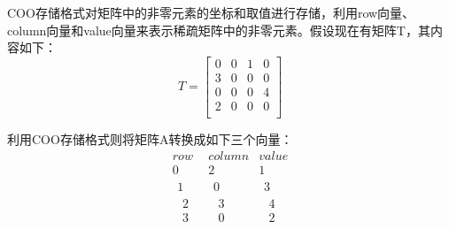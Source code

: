 COO存储格式对矩阵中的非零元素的坐标和取值进行存储，利用row向量、column向量和value向量来表示稀疏矩阵中的非零元素。假设现在有矩阵T，其内容如下：
\[T=\left[ \begin{matrix}
	0&		0&		1&		0\\
	3&		0&		0&		0\\
	0&		0&		0&		4\\
	2&		0&		0&		0\\
\end{matrix} \right] \]

利用COO存储格式则将矩阵A转换成如下三个向量：
\[\begin{matrix}
	row&		column&		value\\
	0&		2&		1\\
	\begin{array}{c}
	1\\
	\begin{array}{c}
	2\\
	3\\
\end{array}\\
\end{array}&		\begin{array}{c}
	0\\
	\begin{array}{c}
	3\\
	0\\
\end{array}\\
\end{array}&		\begin{array}{c}
	3\\
	\begin{array}{c}
	4\\
	2\\
\end{array}\\
\end{array}\\
\end{matrix}\]

